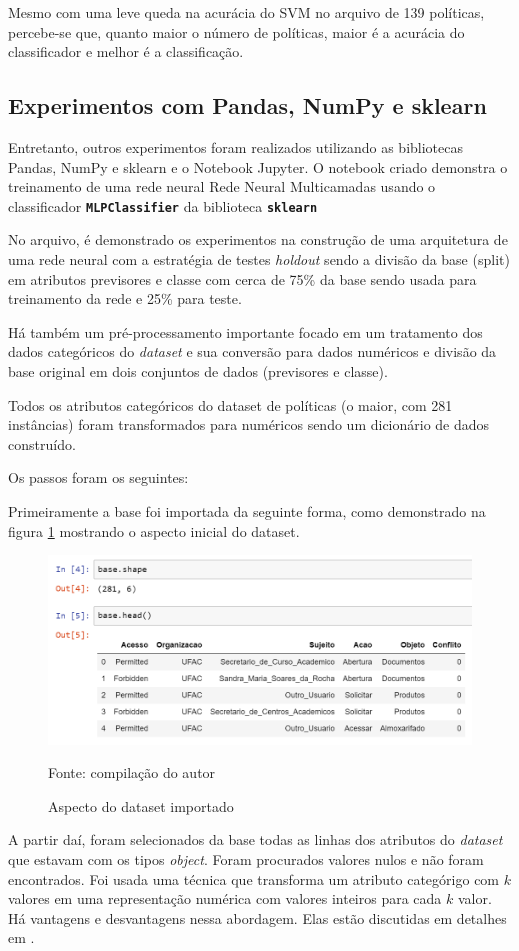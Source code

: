 Mesmo com uma leve queda na acurácia do SVM no arquivo de 139 políticas, percebe-se que, quanto maior o número de políticas, maior é a acurácia do classificador e melhor é a classificação.

\subsection{Experimentos com Pandas, NumPy e sklearn}
Entretanto, outros experimentos foram realizados utilizando as bibliotecas Pandas, NumPy e sklearn e o Notebook Jupyter. O notebook criado demonstra o treinamento de uma rede neural Rede Neural Multicamadas usando o classificador \texttt{\textbf{MLPClassifier}} da biblioteca \texttt{\textbf{sklearn}}

No arquivo, é demonstrado os experimentos na construção de uma arquitetura de uma rede neural com a estratégia de testes \textit{holdout} sendo a divisão da base (split) em atributos previsores e classe com cerca de 75\% da base sendo usada para treinamento da rede e 25\% para teste.

Há também um pré-processamento importante focado em um tratamento dos dados categóricos do \textit{dataset} e sua conversão para dados numéricos e divisão da base original em dois conjuntos de dados (previsores e classe).

Todos os atributos categóricos do dataset de políticas (o maior, com 281 instâncias) foram transformados para numéricos sendo um dicionário de dados construído.

Os passos foram os seguintes:

Primeiramente a base foi importada da seguinte forma, como demonstrado na figura \ref{fig:base-head} mostrando o aspecto inicial do dataset.

\begin{figure}[h!]
	\centering
	\includegraphics[width=.6\textwidth]{imagens/notebook-base1.png}
	\caption{Aspecto do dataset importado}
	\label{fig:base-head}
	{\scriptsize Fonte: compilação do autor}
\end{figure}

A partir daí, foram selecionados da base todas as linhas dos atributos do \textit{dataset} que estavam com os tipos \textit{object}. Foram procurados valores nulos e não foram encontrados. Foi usada uma técnica que transforma um atributo categórigo com $k$ valores em uma representação numérica com valores inteiros para cada $k$ valor. Há vantagens e desvantagens nessa abordagem. Elas estão discutidas em detalhes em \cite{sarkar_2017}.


